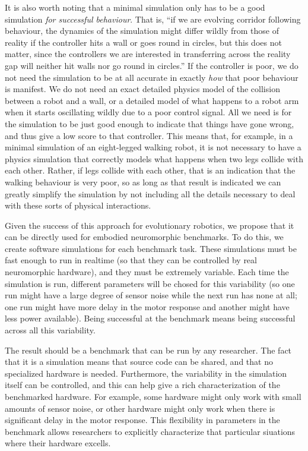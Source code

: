 \documentclass{frontiersSCNS} %
\begin{document}
It is also worth noting that a minimal simulation only has to be a
good simulation \emph{for successful behaviour}.  That is, ``if we are evolving 
corridor following behaviour, the dynamics of the simulation might
differ wildly from those of reality if the controller hits a wall or
goes round in circles, but this does
not matter, since the controllers we are interested in transferring
across the reality gap will neither
hit walls nor go round in circles.''  If the controller is poor, we do not 
need the simulation to be at all accurate in exactly \emph{how} that poor
behaviour is manifest.  We do not need an exact detailed physics model of
the collision between a robot and a wall, or a detailed model of what happens
to a robot arm when it starts oscillating wildly due to a poor control signal.
All we need is for the simulation to be just good enough to indicate that
things have gone wrong, and thus give a low score to that controller.  This
means that, for example, in a minimal simulation of an eight-legged walking robot,
it is not necessary to have a physics simulation that correctly models what
happens when two legs collide with each other.  Rather, if legs collide
with each other, that is an indication that the walking behaviour is very poor,
so as long as that result is indicated we can greatly simplify the simulation
by not including all the details necessary to deal with these sorts of physical
interactions.

Given the success of this approach for evolutionary robotics, we propose
that it can be directly used for embodied neuromorphic benchmarks.  To do
this, we create software simulations for each benchmark task.  These simulations
must be fast enough to run in realtime (so that they can be controlled by
real neuromorphic hardware), and they must be extremely variable.  Each time
the simulation is run, different parameters will be chosed for this variability
(so one run might have a large degree of sensor noise while the next run has
none at all; one run might have more delay in the motor response and another
might have less power available).  Being successful at the benchmark means
being successful across all this variability.  

The result should be a benchmark that can be run by any researcher.  The fact
that it is a simulation means that source code can be shared, and that no
specialized hardware is needed.  Furthermore, the variability in the simulation
itself can be controlled, and this can help give a rich characterization of
the benchmarked hardware.  For example, some hardware might only work with
small amounts of sensor noise, or other hardware might only work when there
is significant delay in the motor response.  This flexibility in parameters
in the benchmark allows researchers to explicitly characterize that particular
siuations where their hardware excells.  
\end{document}
